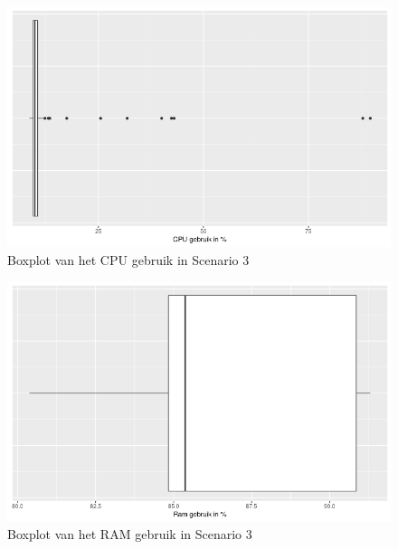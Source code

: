 

\begin{figure}[h]
	\centering
	\includegraphics[width=0.75\linewidth]{img/SC3_CPUBox.png}
	\caption{Boxplot van het CPU gebruik in Scenario 3}
	\label{fig:SC3_CPUBox}
\end{figure}

\begin{figure}[h]
	\centering
	\includegraphics[width=0.75\linewidth]{img/SC3_RAMBox.png}
	\caption{Boxplot van het RAM gebruik in Scenario 3}
	\label{fig:SC3_RAMBox}
\end{figure}



